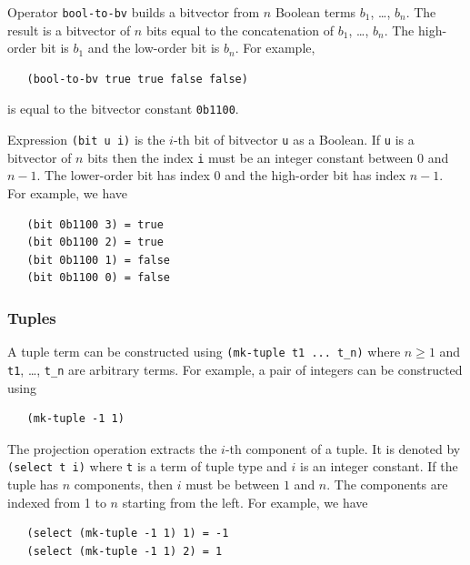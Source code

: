 \documentclass[11pt,twoside,fleqn,openright,titlepage]{cslreport}
\begin{document}
\medskip\noindent
Operator \texttt{bool-to-bv} builds a bitvector from $n$ Boolean
terms $b_1$, \ldots, $b_n$.  The result is a bitvector of $n$ bits
equal to the concatenation of $b_1$, \ldots, $b_n$. The high-order
bit is $b_1$ and the low-order bit is $b_n$. For example,
\begin{small}
\begin{verbatim}
   (bool-to-bv true true false false)
\end{verbatim}
\end{small}
is equal to the bitvector constant \texttt{0b1100}.

\medskip\noindent
Expression \texttt{(bit u i)} is the $i$-th bit of bitvector
\texttt{u} as a Boolean. If \texttt{u} is a bitvector of $n$ bits then
the index \texttt{i} must be an integer constant between 0 and $n-1$.
The lower-order bit has index 0 and the high-order bit has index $n-1$.
For example, we have
\begin{small}
\begin{verbatim}
   (bit 0b1100 3) = true
   (bit 0b1100 2) = true
   (bit 0b1100 1) = false
   (bit 0b1100 0) = false
\end{verbatim}
\end{small}


\subsubsection*{Tuples}

A tuple term can be constructed using \texttt{(mk-tuple t1 ... t\_n)}
where $n\geq1$ and \texttt{t1}, \ldots, \texttt{t\_n} are arbitrary
terms. For example, a pair of integers can be constructed using
\begin{small}
\begin{verbatim}
   (mk-tuple -1 1)
\end{verbatim}
\end{small}

\medskip\noindent The projection operation extracts the $i$-th
component of a tuple. It is denoted by \texttt{(select t i)} where
\texttt{t} is a term of tuple type and $i$ is an integer constant.  If
the tuple has $n$ components, then $i$ must be between $1$ and
$n$. The components are indexed from 1 to $n$ starting from the
left. For example, we have
\begin{small}
\begin{verbatim}
   (select (mk-tuple -1 1) 1) = -1
   (select (mk-tuple -1 1) 2) = 1
\end{verbatim}
\end{small}
\end{document}
